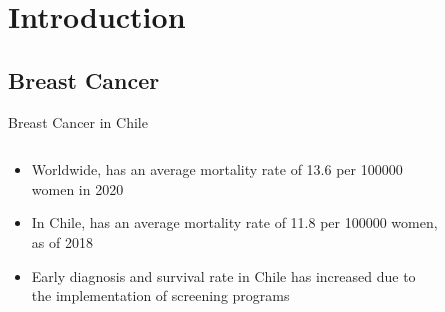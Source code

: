 \section{Introduction}
\subsection{Breast Cancer}
\begin{frame}{Breast Cancer in Chile}
    \begin{columns}
        \begin{column}{0.6\textwidth}
            \begin{itemize}
                \item Worldwide, has an average mortality rate of \num{13.6} per \num{100000} women in 2020 
                \item In Chile, has an average mortality rate of \num{11.8} per \num{100000} women, as of 2018 
                \item Early diagnosis and survival rate in Chile has increased due to the implementation of screening programs 
            \end{itemize}
        \end{column}
        \begin{column}{0.4\textwidth}
            \begin{figure}
                \centering

\end{figure}
\end{column}
\end{columns}
\end{frame}
